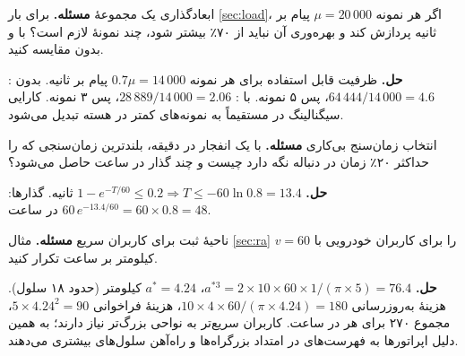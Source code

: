 \documentclass[11pt,a4paper]{article}
\begin{document}
\begin{examplebox}{ابعادگذاری یک مجموعهٔ }\label{ex:load}
\textbf{مسئله.} برای بار \cref{sec:load}، اگر هر نمونه $\mu = 20\,000$ پیام بر ثانیه پردازش کند و بهره‌وری آن نباید از ۷۰٪ بیشتر شود، چند نمونهٔ  لازم
است؟ با و بدون  مقایسه کنید.

\textbf{حل.} ظرفیت قابل استفاده برای هر نمونه $0.7\mu = 14\,000$ پیام بر ثانیه. بدون : $64\,444/14\,000 = 4.6$، پس ۵ نمونه. با :
$28\,889/14\,000 = 2.06$، پس ۳ نمونه. کارایی سیگنالینگ در  مستقیماً به نمونه‌های کمتر در هسته تبدیل می‌شود.
\end{examplebox}

\begin{examplebox}{انتخاب زمان‌سنج بی‌کاری}\label{ex:timer}
\textbf{مسئله.} با یک انفجار در دقیقه، بلندترین زمان‌سنجی که  را حداکثر ۲۰٪ زمان در دنباله نگه دارد چیست و چند گذار در ساعت حاصل می‌شود؟

\textbf{حل.} $1 - e^{-T/60} \le 0.2 \Rightarrow T \le -60\ln 0.8 = 13.4$ ثانیه. گذارها: $60\,e^{-13.4/60} = 60\times0.8 = 48$ در ساعت.
\end{examplebox}

\begin{examplebox}{ناحیهٔ ثبت برای کاربران سریع}\label{ex:ra}
\textbf{مسئله.} مثال \cref{sec:ra} را برای کاربران خودرویی با $v = 60$ کیلومتر بر ساعت تکرار کنید.

\textbf{حل.} $a^{*3} = 2\times10\times60\times1/(\pi\times5) = 76.4$، $a^{*} = 4.24$ کیلومتر (حدود ۱۸ سلول). هزینهٔ به‌روزرسانی $10\times4\times60/(\pi\times4.24) = 180$،
هزینهٔ فراخوانی $5\times4.24^2 = 90$، مجموع ۲۷۰ برای هر  در ساعت. کاربران سریع‌تر به نواحی بزرگ‌تر نیاز دارند؛ به همین دلیل اپراتورها به
فهرست‌های  در امتداد بزرگراه‌ها و راه‌آهن سلول‌های بیشتری می‌دهند.
\end{examplebox}

\end{document}
